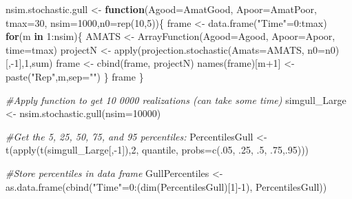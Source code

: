 \documentclass[
]{book}
\newenvironment{Shaded}{\begin{snugshade}}{\end{snugshade}}
\newcommand{\AttributeTok}[1]{\textcolor[rgb]{0.77,0.63,0.00}{#1}}
\newcommand{\CommentTok}[1]{\textcolor[rgb]{0.56,0.35,0.01}{\textit{#1}}}
\newcommand{\ControlFlowTok}[1]{\textcolor[rgb]{0.13,0.29,0.53}{\textbf{#1}}}
\newcommand{\DecValTok}[1]{\textcolor[rgb]{0.00,0.00,0.81}{#1}}
\newcommand{\FunctionTok}[1]{\textcolor[rgb]{0.00,0.00,0.00}{#1}}
\newcommand{\NormalTok}[1]{#1}
\newcommand{\OtherTok}[1]{\textcolor[rgb]{0.56,0.35,0.01}{#1}}
\newcommand{\SpecialCharTok}[1]{\textcolor[rgb]{0.00,0.00,0.00}{#1}}
\newcommand{\StringTok}[1]{\textcolor[rgb]{0.31,0.60,0.02}{#1}}
\begin{document}
\begin{Shaded}
\begin{Highlighting}[]
\NormalTok{nsim.stochastic.gull }\OtherTok{\textless{}{-}} \ControlFlowTok{function}\NormalTok{(}\AttributeTok{Agood=}\NormalTok{AmatGood, }\AttributeTok{Apoor=}\NormalTok{AmatPoor, }\AttributeTok{tmax=}\DecValTok{30}\NormalTok{, }\AttributeTok{nsim=}\DecValTok{1000}\NormalTok{,}\AttributeTok{n0=}\FunctionTok{rep}\NormalTok{(}\DecValTok{10}\NormalTok{,}\DecValTok{5}\NormalTok{))\{}
\NormalTok{  frame }\OtherTok{\textless{}{-}}  \FunctionTok{data.frame}\NormalTok{(}\StringTok{"Time"}\OtherTok{=}\DecValTok{0}\SpecialCharTok{:}\NormalTok{tmax)}
  \ControlFlowTok{for}\NormalTok{(m }\ControlFlowTok{in} \DecValTok{1}\SpecialCharTok{:}\NormalTok{nsim)\{}
\NormalTok{    AMATS }\OtherTok{\textless{}{-}} \FunctionTok{ArrayFunction}\NormalTok{(}\AttributeTok{Agood=}\NormalTok{Agood, }\AttributeTok{Apoor=}\NormalTok{Apoor, }\AttributeTok{time=}\NormalTok{tmax)}
\NormalTok{    projectN }\OtherTok{\textless{}{-}} \FunctionTok{apply}\NormalTok{(}\FunctionTok{projection.stochastic}\NormalTok{(}\AttributeTok{Amats=}\NormalTok{AMATS, }\AttributeTok{n0=}\NormalTok{n0)[,}\SpecialCharTok{{-}}\DecValTok{1}\NormalTok{],}\DecValTok{1}\NormalTok{,sum)}
\NormalTok{    frame }\OtherTok{\textless{}{-}} \FunctionTok{cbind}\NormalTok{(frame, projectN)}
     \FunctionTok{names}\NormalTok{(frame)[m}\SpecialCharTok{+}\DecValTok{1}\NormalTok{] }\OtherTok{\textless{}{-}} \FunctionTok{paste}\NormalTok{(}\StringTok{"Rep"}\NormalTok{,m,}\AttributeTok{sep=}\StringTok{""}\NormalTok{)}
\NormalTok{  \}}
\NormalTok{  frame}
\NormalTok{\}}

\CommentTok{\#Apply function to get 10 0000 realizations (can take some time)}
\NormalTok{simgull\_Large }\OtherTok{\textless{}{-}} \FunctionTok{nsim.stochastic.gull}\NormalTok{(}\AttributeTok{nsim=}\DecValTok{10000}\NormalTok{)}

\CommentTok{\#Get the 5, 25, 50, 75, and 95 percentiles:}
\NormalTok{PercentilesGull  }\OtherTok{\textless{}{-}} \FunctionTok{t}\NormalTok{(}\FunctionTok{apply}\NormalTok{(}\FunctionTok{t}\NormalTok{(simgull\_Large[,}\SpecialCharTok{{-}}\DecValTok{1}\NormalTok{]),}\DecValTok{2}\NormalTok{, quantile, }\AttributeTok{probs=}\FunctionTok{c}\NormalTok{(.}\DecValTok{05}\NormalTok{, .}\DecValTok{25}\NormalTok{, .}\DecValTok{5}\NormalTok{, .}\DecValTok{75}\NormalTok{,.}\DecValTok{95}\NormalTok{)))}

 
\CommentTok{\#Store percentiles in data frame  }
\NormalTok{GullPercentiles }\OtherTok{\textless{}{-}} \FunctionTok{as.data.frame}\NormalTok{(}\FunctionTok{cbind}\NormalTok{(}\StringTok{"Time"}\OtherTok{=}\DecValTok{0}\SpecialCharTok{:}\NormalTok{(}\FunctionTok{dim}\NormalTok{(PercentilesGull)[}\DecValTok{1}\NormalTok{]}\SpecialCharTok{{-}}\DecValTok{1}\NormalTok{),  PercentilesGull))}


\end{Highlighting}
\end{Shaded}
\end{document}
